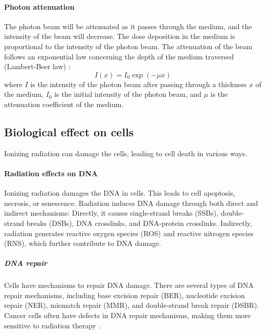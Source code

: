 \paragraph{Photon attenuation}
The photon beam will be attenuated as it passes through the medium, and the intensity of the beam will decrease.
The dose deposition in the medium is proportional to the intensity of the photon beam.
The attenuation of the beam follows an exponential law concerning the depth of the medium traversed (Lambert-Beer law) \cite{Beer1852}:
$$I(x) = I_0 \exp(-\mu x)$$
where $I$ is the intensity of the photon beam after passing through a thickness $x$ of the medium,
$I_0$ is the initial intensity of the photon beam,
and $\mu$ is the attenuation coefficient of the medium.


\subsection{Biological effect on cells}
Ionizing radiation can damage the cells, leading to cell death in various ways.

\paragraph{Radiation effects on DNA}
Ionizing radiation damages the DNA in cells.
This leads to cell apoptosis, necrosis, or senescence.
Radiation induces DNA damage through both direct and indirect mechanisms:
Directly, it causes single-strand breaks (SSBs), double-strand breaks (DSBs), DNA crosslinks, and DNA-protein crosslinks.
Indirectly, radiation generates reactive oxygen species (ROS) and reactive nitrogen species (RNS), which further contribute to DNA damage.

\subparagraph{DNA repair}
Cells have mechanisms to repair DNA damage.
There are several types of DNA repair mechanisms, including base excision repair (BER), nucleotide excision repair (NER), mismatch repair (MMR), and double-strand break repair (DSBR).
Cancer cells often have defects in DNA repair mechanisms, making them more sensitive to radiation therapy \cite{Brierley2016}.

